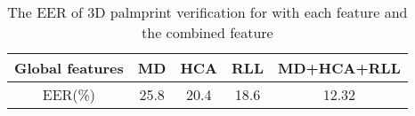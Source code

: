 \begin{table}[htbp]
  \centering
  \caption{The EER of 3D palmprint verification for with each feature and the combined feature}
    \begin{tabular}{ccccc}
    \toprule
    Global features & MD    & HCA   & RLL   & MD+HCA+RLL \\
    \midrule
    EER(\%) & 25.8  & 20.4  & 18.6  & 12.32 \\
    \bottomrule
    \end{tabular}%
  \label{tab:experiment:verification}%
\end{table}%
